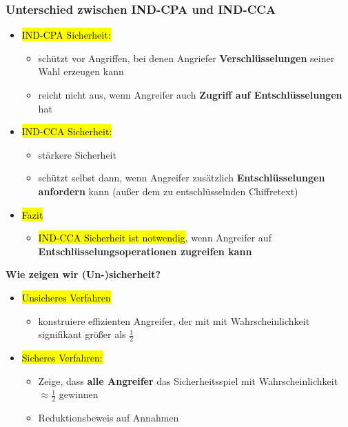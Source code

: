 \documentclass[a4paper, 10pt]{article}
\begin{document}
\subsubsection{Unterschied zwischen IND-CPA und IND-CCA}
\begin{itemize}
    \item \hl{IND-CPA Sicherheit:}
    \begin{itemize}
        \item schützt vor Angriffen, bei denen Angriefer \textbf{Verschlüsselungen} seiner Wahl erzeugen kann
        \item reicht nicht aus, wenn Angreifer auch \textbf{Zugriff auf Entschlüsselungen} hat
    \end{itemize}

    \item \hl{IND-CCA Sicherheit:}
    \begin{itemize}
        \item stärkere Sicherheit
        \item schützt selbst dann, wenn Angreifer zusätzlich \textbf{Entschlüsselungen anfordern} kann (außer dem zu entschlüsselnden Chiffretext)
    \end{itemize}

    \item \hl{Fazit}
    \begin{itemize}
        \item \hl{IND-CCA Sicherheit ist notwendig}, wenn Angreifer auf \textbf{Entschlüsselungsoperationen zugreifen kann}
    \end{itemize}
\end{itemize}

\noindent\textbf{Wie zeigen wir (Un-)sicherheit?}
\begin{itemize}
    \item \hl{Unsicheres Verfahren}
    \begin{itemize}
        \item konstruiere effizienten Angreifer, der mit mit Wahrscheinlichkeit signifikant größer als $\frac{1}{2}$
    \end{itemize}

    \item \hl{Sicheres Verfahren:}
    \begin{itemize}
        \item Zeige, dass \textbf{alle Angreifer} das Sicherheitsspiel mit Wahrscheinlichkeit $\approx \frac{1}{2}$ gewinnen
        \item Reduktionsbeweis auf Annahmen
    \end{itemize}
\end{itemize}
\end{document}
